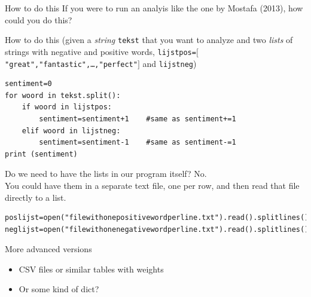 \documentclass{beamer}
\begin{document}
\begin{frame}[fragile]{How to do this}
If you were to run an analyis like the one by Mostafa (2013), how could you do this?
\end{frame}

\begin{frame}[fragile]{How to do this}
\scriptsize{ 
(given a \emph{string} \texttt{tekst} that you want to analyze and two 
\emph{lists} of strings with negative and positive words, 
\texttt{lijstpos=$[$"great","fantastic",\ldots,"perfect"$]$} and \texttt{lijstneg})\\
}

\begin{lstlisting}
sentiment=0
for woord in tekst.split():
    if woord in lijstpos:
        sentiment=sentiment+1    #same as sentiment+=1
    elif woord in lijstneg:
        sentiment=sentiment-1    #same as sentiment-=1
print (sentiment)
\end{lstlisting}
\end{frame}


\begin{frame}[fragile]{Do we need to have the lists in our program itself?}
No.\\
You could have them in a separate text file, one per row, and then read that file directly to a list.\\
\begin{lstlisting}
poslijst=open("filewithonepositivewordperline.txt").read().splitlines()
neglijst=open("filewithonenegativewordperline.txt").read().splitlines()
\end{lstlisting}
\end{frame}


{
\begin{frame}[plain]
\end{frame}
}


\begin{frame}{More advanced versions}
\begin{itemize}
\item CSV files or similar tables with weights
\item Or some kind of dict?
\end{itemize}
\end{frame}
\end{document}
